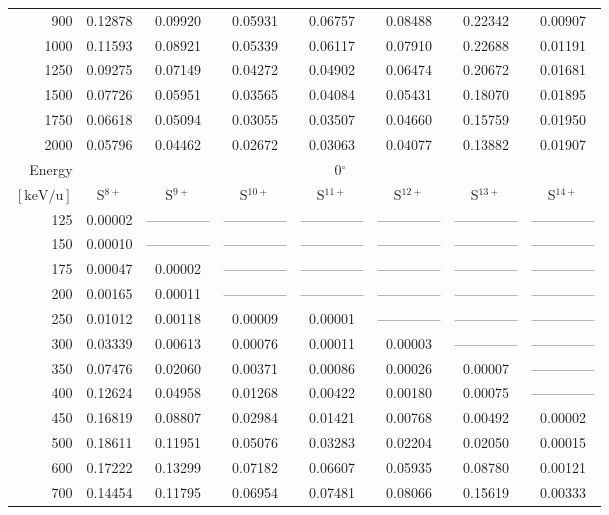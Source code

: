 \begin{table}[ht]
\begin{tabular}{r|c|c|c|c|c|c|c}
      900 & 0.12878 & 0.09920 & 0.05931 & 0.06757 & 0.08488 & 0.22342 & 0.00907 \\
     1000 & 0.11593 & 0.08921 & 0.05339 & 0.06117 & 0.07910 & 0.22688 & 0.01191 \\
     1250 & 0.09275 & 0.07149 & 0.04272 & 0.04902 & 0.06474 & 0.20672 & 0.01681 \\
     1500 & 0.07726 & 0.05951 & 0.03565 & 0.04084 & 0.05431 & 0.18070 & 0.01895 \\
     1750 & 0.06618 & 0.05094 & 0.03055 & 0.03507 & 0.04660 & 0.15759 & 0.01950 \\
     2000 & 0.05796 & 0.04462 & 0.02672 & 0.03063 & 0.04077 & 0.13882 & 0.01907 \\ \cline{1-8}
    Energy & \multicolumn{7}{c}{0$^\circ$} \\ \cline{2-8}
    $\mathrm{[keV/u]}$ & S$^{8+}$ & S$^{9+}$ & S$^{10+}$ & S$^{11+}$ & S$^{12+}$ & S$^{13+}$ & S$^{14+}$ \\ \cline{1-8}
      125 & 0.00002 & -------------- & -------------- & -------------- & -------------- & -------------- & -------------- \\
      150 & 0.00010 & -------------- & -------------- & -------------- & -------------- & -------------- & -------------- \\
      175 & 0.00047 & 0.00002 & -------------- & -------------- & -------------- & -------------- & -------------- \\
      200 & 0.00165 & 0.00011 & -------------- & -------------- & -------------- & -------------- & -------------- \\
      250 & 0.01012 & 0.00118 & 0.00009 & 0.00001 & -------------- & -------------- & -------------- \\
      300 & 0.03339 & 0.00613 & 0.00076 & 0.00011 & 0.00003 & -------------- & -------------- \\
      350 & 0.07476 & 0.02060 & 0.00371 & 0.00086 & 0.00026 & 0.00007 & -------------- \\
      400 & 0.12624 & 0.04958 & 0.01268 & 0.00422 & 0.00180 & 0.00075 & -------------- \\
      450 & 0.16819 & 0.08807 & 0.02984 & 0.01421 & 0.00768 & 0.00492 & 0.00002 \\
      500 & 0.18611 & 0.11951 & 0.05076 & 0.03283 & 0.02204 & 0.02050 & 0.00015 \\
      600 & 0.17222 & 0.13299 & 0.07182 & 0.06607 & 0.05935 & 0.08780 & 0.00121 \\
      700 & 0.14454 & 0.11795 & 0.06954 & 0.07481 & 0.08066 & 0.15619 & 0.00333 \\

\end{tabular}
\end{table}
